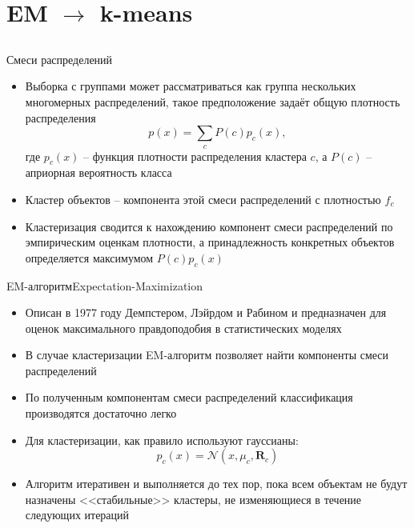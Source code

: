 \documentclass[compress,unicode]{beamer}
\begin{document}
\section{EM $\rightarrow$ k-means}
\subsection{}

\begin{frame}{Смеси распределений}
\begin{itemize}
\item Выборка с группами может рассматриваться как группа нескольких многомерных распределений, такое предположение задаёт общую плотность распределения
$$
p(x) = \sum_c P(c) p_c (x),
$$
где $p_c (x)$ -- функция плотности распределения кластера $c$, а $P(c)$ -- априорная вероятность класса
\item Кластер объектов --  компонента этой смеси распределений с плотностью $f_c$
\item Кластеризация сводится к нахождению компонент смеси распределений по эмпирическим оценкам плотности, а принадлежность конкретных объектов определяется максимумом $P(c) p_c(x)$
\end{itemize}

\end{frame}



\begin{frame}{EM-алгоритм}{Expectation-Maximization}
\begin{itemize}
	\item Описан в 1977 году Демпстером, Лэйрдом и Рабином и предназначен для оценок максимального правдоподобия в статистических моделях
	\item В случае кластеризации EM-алгоритм позволяет найти компоненты смеси распределений
	\item По полученным компонентам смеси распределений классификация производятся достаточно легко
	\item Для кластеризации, как правило используют гауссианы:
	$$p_c (x) = \mathcal{N} (x, \mu_c, \mathbf{R}_c)$$
	\item Алгоритм итеративен и выполняется до тех пор, пока всем объектам не будут назначены <<стабильные>> кластеры, не изменяющиеся в течение следующих итераций

\end{itemize}
\end{frame}
\end{document}
